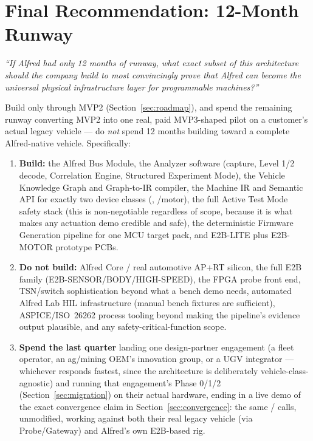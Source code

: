 \section{Final Recommendation: 12-Month Runway}
\label{sec:final-recommendation}

\begin{center}
\Large\textit{``If Alfred had only 12 months of runway, what exact subset of this architecture should the company build to most convincingly prove that Alfred can become the universal physical infrastructure layer for programmable machines?''}
\end{center}

\begin{decision}[title={Concrete recommendation}]
Build only through MVP2 (Section~\ref{sec:roadmap}), and spend the remaining runway converting MVP2 into one real, paid MVP3-shaped pilot on a customer's actual legacy vehicle --- do \emph{not} spend 12 months building toward a complete Alfred-native vehicle. Specifically:

\begin{enumerate}
\item \textbf{Build:} the Alfred Bus Module, the Analyzer software (capture, Level 1/2 decode, Correlation Engine, Structured Experiment Mode), the Vehicle Knowledge Graph and Graph-to-IR compiler, the Machine IR and Semantic API for exactly two device classes (, /motor), the full Active Test Mode safety stack (this is non-negotiable regardless of scope, because it is what makes any actuation demo credible and safe), the deterministic Firmware Generation pipeline for one MCU target pack, and E2B-LITE plus E2B-MOTOR prototype PCBs.
\item \textbf{Do not build:} Alfred Core / real automotive AP+RT silicon, the full E2B family (E2B-SENSOR/BODY/HIGH-SPEED), the FPGA probe front end, TSN/switch sophistication beyond what a bench demo needs, automated Alfred Lab HIL infrastructure (manual bench fixtures are sufficient), ASPICE/ISO~26262 process tooling beyond making the pipeline's evidence output plausible, and any safety-critical-function scope.
\item \textbf{Spend the last quarter} landing one design-partner engagement (a fleet operator, an ag/mining OEM's innovation group, or a UGV integrator --- whichever responds fastest, since the architecture is deliberately vehicle-class-agnostic) and running that engagement's Phase 0/1/2 (Section~\ref{sec:migration}) on their actual hardware, ending in a live demo of the exact convergence claim in Section~\ref{sec:convergence}: the same / calls, unmodified, working against both their real legacy vehicle (via Probe/Gateway) and Alfred's own E2B-based rig.
\end{enumerate}
\end{decision}

